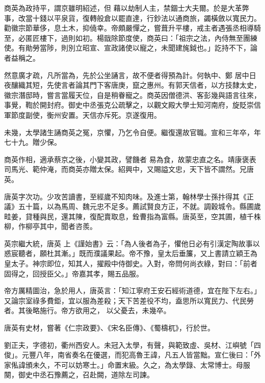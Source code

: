\begin{pinyinscope}
 商英為政持平，謂京雖明紹述，但
 藉以劫制人主，禁錮士大夫爾。於是大革弊事，改當十錢以平泉貨，復轉般倉以罷直達，行鈔法以通商旅，蠲橫斂以寬民力。勸徽宗節華侈，息土木，抑僥幸。帝頗嚴憚之，嘗葺升平樓，戒主者遇張丞相導騎至，必匿匠樓下，過則如初。楊戩除節度使，商英曰：「祖宗之法，內侍無至團練使。有勛勞當陟，則別立昭宣、宣政諸使以寵之，未聞建旄鉞也。」訖持不下，論者益稱之。



 然意廣才疏，凡所當為，先於公坐誦言，故不便者得預為計。何執中、鄭
 居中日夜釀織其短，先使言者論其門下客唐庚，竄之惠州。有郭天信者，以方技隸太史，徽宗潛邸時，嘗言當履天位，自是稍眷寵之。商英因僧德洪、客彭幾與語言往來，事覺，鞫於開封府。御史中丞張克公疏擊之，以觀文殿大學士知河南府，旋貶崇信軍節度副使，衡州安置。天信亦斥死。京遂復用。



 未幾，太學諸生誦商英之冤，京懼，乃乞令自便。繼復還故官職。宣和三年卒，年七十九。贈少保。



 商英作相，適承蔡京之後，小變其政，譬饑者
 易為食，故蒙忠直之名。靖康褒表司馬光、範仲淹，而商英亦贈太保。紹興中，又賜謚文忠，天下皆不謂然。兄唐英。



 唐英字次功。少攻苦讀書，至經歲不知肉味。及進士第，翰林學士孫抃得其《正議》五十篇，以為馬周、魏元忠不足多。薦試賢良方正，不就。調穀城令。縣圃歲畦姜，貸種與民，還其陳，復配賣取息，銓曹指為富縣。唐英至，空其圃，植千株柳，作柳亭其中，聞者咨羨。



 英宗繼大統，唐英
 上《謹始書》云：「為人後者為子，懼他日必有引漢定陶故事以惑宸聽者，願杜其漸。」既而濮議果起。帝不豫，皇太后垂簾，又上書請立穎王為皇太子。神宗即位，知其人，擢殿中侍御史。入對，帝問何尚衣綠，對曰：「前者固得之，回授臣父。」帝嘉其孝，賜五品服。



 帝方厲精圖治，急於用人，唐英言：「知江寧府王安石經術道德，宜在陛下左右。」又論宗室祿多費鉅，宜以服為差殺；天下苦差役不均，盍思所以寬民力、代民勞者。其後略施行。帝方欲用之，
 以父憂去，未幾卒。



 唐英有史材，嘗著《仁宗政要》、《宋名臣傳》、《蜀檮杌》，行於世。



 劉正夫，字德初，衢州西安人。未冠入太學，有聲，與範致虛、吳材、江嶼號「四俊」。元豐八年，南省奏名在優選，而犯高魯王諱，凡五人皆當黜。宣仁後曰：「外家俬諱頒未久，不可以妨寒士。」命置末級。久之，為太學錄、太常博士。母服闋，御史中丞石豫薦之，召赴闕，道除左司諫。




\end{pinyinscope}
